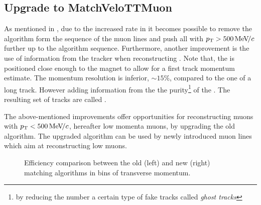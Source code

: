 \subsection{Upgrade to MatchVeloTTMuon}
\label{sec:matchvelottmuon}
As mentioned in , due to the increased \hltone rate in \runtwo it becomes possible to
remove the \mvm algorithm form the sequence of the \hltone muon lines and push all \veloTracks with
$\mbox{$p_{\rm T}$}>500 {\mathrm{\,Me\kern -0.1em V\!/}c}$ further up to the \hltone algorithm sequence. Furthermore, another improvement is the use of
information from the \ttracker tracker when reconstructing \veloTracks \cite{LHCb-PUB-2015-005}.
Note that, the \ttracker is positioned close enough to the \lhcb magnet to allow for a first track momentum estimate.
The \ttracker momentum resolution is inferior, $\sim 15\%$, compared to the one of a long track. However adding
information from the \ttracker the purity\footnote{by reducing the number a certain type of fake
tracks called {\it ghost tracks}}\cite{Bowen:2105078} of the \veloTracks. The resulting set of
tracks are called \veloTTracks.

The above-mentioned improvements offer opportunities for reconstructing muons with $\mbox{$p_{\rm T}$}<500 {\mathrm{\,Me\kern -0.1em V\!/}c}$,
hereafter low momenta muons, by upgrading the old \mvm algorithm. The upgraded algorithm can be
used by newly introduced \hltone muon lines which aim at reconstructing low \pt muons.

\begin{figure}[t]
  \centering
  \begin{subfigure}{0.5\textwidth}
    \raggedright
    \scalebox{.6}{}
    \caption{}
    \label{mvTTm_eff_pt}
  \end{subfigure}%
  \hfill%
  \begin{subfigure}{0.5\textwidth}
    \raggedleft
    \scalebox{.6}{}
    \caption{}
    \label{mvm_eff_pt}
  \end{subfigure}
  \caption{Efficiency comparison between the old (left) and new (right) matching algorithms in bins of transverse momentum.}
 \label{mvm_eff_pt_zoom_comp}
\end{figure}

